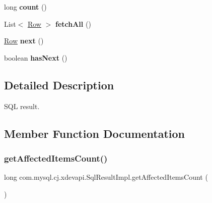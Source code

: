 \begin{DoxyCompactItemize}
\item 
\mbox{\label{classcom_1_1mysql_1_1cj_1_1xdevapi_1_1_sql_result_impl_a3b562920da1050ee09f24fb4638b7f9c}} 
long {\bfseries count} ()
\item 
\mbox{\label{classcom_1_1mysql_1_1cj_1_1xdevapi_1_1_sql_result_impl_a7d6ed19e6cf1aedeca7f530150ab0893}} 
List$<$ \mbox{\hyperlink{interfacecom_1_1mysql_1_1cj_1_1result_1_1_row}{Row}} $>$ {\bfseries fetch\+All} ()
\item 
\mbox{\label{classcom_1_1mysql_1_1cj_1_1xdevapi_1_1_sql_result_impl_a03538872432cdca74d578646e5793d3c}} 
\mbox{\hyperlink{interfacecom_1_1mysql_1_1cj_1_1result_1_1_row}{Row}} {\bfseries next} ()
\item 
\mbox{\label{classcom_1_1mysql_1_1cj_1_1xdevapi_1_1_sql_result_impl_a6d3626107a3e51c71e4857dce6c669e2}} 
boolean {\bfseries has\+Next} ()
\end{DoxyCompactItemize}


\subsection{Detailed Description}
S\+QL result. 

\subsection{Member Function Documentation}
\mbox{\label{classcom_1_1mysql_1_1cj_1_1xdevapi_1_1_sql_result_impl_a4fe6c0a9ccb9785f48c25bbeebec10e2}} 
\subsubsection{\texorpdfstring{get\+Affected\+Items\+Count()}{getAffectedItemsCount()}}
{\footnotesize\ttfamily long com.\+mysql.\+cj.\+xdevapi.\+Sql\+Result\+Impl.\+get\+Affected\+Items\+Count (\begin{DoxyParamCaption}{ }\end{DoxyParamCaption})}

